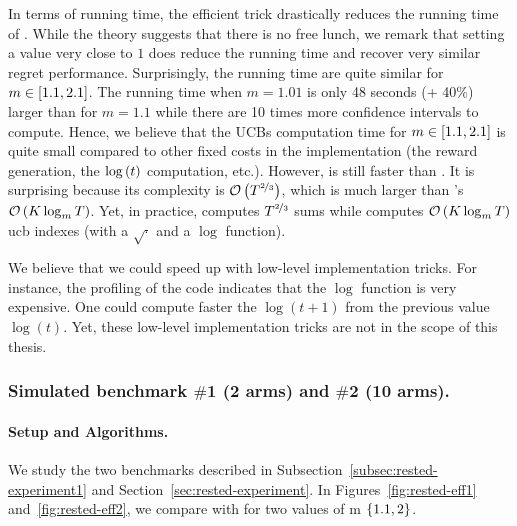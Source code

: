 In terms of running time, the efficient trick drastically reduces the running time of \EFFRAW. While the theory suggests that there is no free lunch, we remark that setting a value very close to $1$ does reduce the running time and recover very similar regret performance. Surprisingly, the running time are quite similar for $m \in \left[1.1, 2.1\right]$. The running time when $m=1.01$ is only 48 seconds (+ 40$\%$) larger than for $m=1.1$ while there are 10 times more confidence intervals to compute. Hence, we believe that the UCBs computation time for $m \in \left[1.1, 2.1\right]$ is quite small compared to other fixed costs in the implementation (the reward generation, the $\log\left(t\right)$ computation, etc.).   However, \wSWA is still faster than \EFFRAW. It is surprising because its complexity is $\mathcal{O}\left(T^{\nicefrac{2}{3}}\right)$, which is much larger than \EFFRAW 's $\mathcal{O}\left(K\log_m{T}\right)$. Yet, in practice, \wSWA computes $T^{\nicefrac{2}{3}}$ sums while \EFFRAW computes $\mathcal{O}\left(K\log_m{T}\right)$ ucb indexes (with a $\sqrt{\cdot}$ and a $\log$ function).

We believe that we could speed up \EFFRAW with low-level implementation tricks. For instance, the profiling of the code indicates that the $\log$ function is very expensive. One could compute faster the $\log(t+1)$ from the previous value $\log(t)$. Yet, these low-level implementation tricks are not in the scope of this thesis. 

\subsubsection{Simulated benchmark $\#$1 (2 arms) and $\#$2 (10 arms).}
\paragraph{Setup and Algorithms.} We study the two benchmarks described in Subsection~\ref{subsec:rested-experiment1} and Section~\ref{sec:rested-experiment}. In Figures~\ref{fig:rested-eff1} and~\ref{fig:rested-eff2}, we compare \RAWUCB with \EFFRAW for two values of m $\left\{1.1, 2\right\}$.

